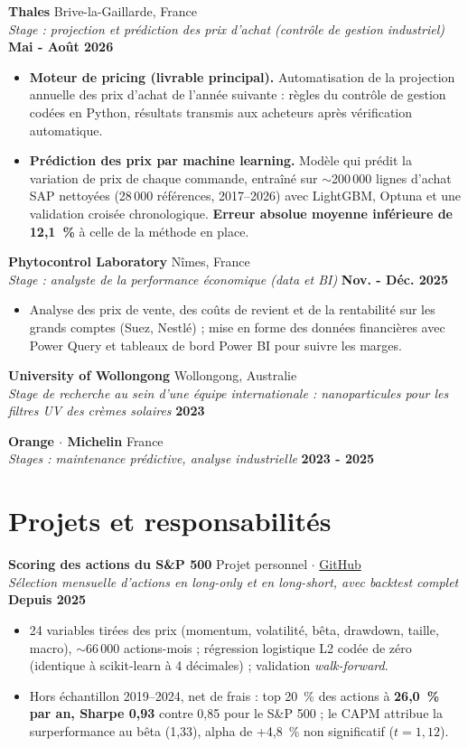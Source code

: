 \documentclass[a4paper,10pt]{article}
\newcommand{\cventry}[4]{
    \vspace{2pt}
    \noindent \textbf{#1} \hfill #2 \\
    \noindent \textit{#3} \hfill \textbf{#4}
}
\newenvironment{cvbullets}{
    \begin{itemize}[itemsep=1.5pt, topsep=2pt, leftmargin=1.1em, label=\tiny$\bullet$]
}{
    \end{itemize} \vspace{1pt}
}
\begin{document}
\cventry{Thales}{Brive-la-Gaillarde, France}{Stage : projection et prédiction des prix d'achat (contrôle de gestion industriel)}{Mai - Août 2026}
\begin{cvbullets}
    \item \textbf{Moteur de pricing (livrable principal).} Automatisation de la projection annuelle des prix d'achat de l'année suivante : règles du contrôle de gestion codées en Python, résultats transmis aux acheteurs après vérification automatique.
    \item \textbf{Prédiction des prix par machine learning.} Modèle qui prédit la variation de prix de chaque commande, entraîné sur $\sim$200\,000 lignes d'achat SAP nettoyées (28\,000 références, 2017--2026) avec LightGBM, Optuna et une validation croisée chronologique. \textbf{Erreur absolue moyenne inférieure de 12,1~\%} à celle de la méthode en place.
\end{cvbullets}

\cventry{Phytocontrol Laboratory}{Nîmes, France}{Stage : analyste de la performance économique (data et BI)}{Nov. - Déc. 2025}
\begin{cvbullets}
    \item Analyse des prix de vente, des coûts de revient et de la rentabilité sur les grands comptes (Suez, Nestlé) ; mise en forme des données financières avec Power Query et tableaux de bord Power BI pour suivre les marges.
\end{cvbullets}

\cventry{University of Wollongong}{Wollongong, Australie}{Stage de recherche au sein d'une équipe internationale : nanoparticules pour les filtres UV des crèmes solaires}{2023}

\cventry{Orange $\cdot$ Michelin}{France}{Stages : maintenance prédictive, analyse industrielle}{2023 - 2025}
\vspace{3pt}

\section{Projets et responsabilités}

\cventry{Scoring des actions du S\&P 500}{Projet personnel $\cdot$ \href{https://github.com/antojfr/sp500-quant-scoring}{GitHub}}{Sélection mensuelle d'actions en long-only et en long-short, avec backtest complet}{Depuis 2025}
\begin{cvbullets}
    \item 24 variables tirées des prix (momentum, volatilité, bêta, drawdown, taille, macro), $\sim$66\,000 actions-mois ; régression logistique L2 codée de zéro (identique à scikit-learn à 4 décimales) ; validation \textit{walk-forward}.
    \item Hors échantillon 2019--2024, net de frais : top 20~\% des actions à \textbf{26,0~\% par an, Sharpe 0,93} contre 0,85 pour le S\&P 500 ; le CAPM attribue la surperformance au bêta (1,33), alpha de +4,8~\% non significatif ($t = 1{,}12$).
\end{cvbullets}
\end{document}
